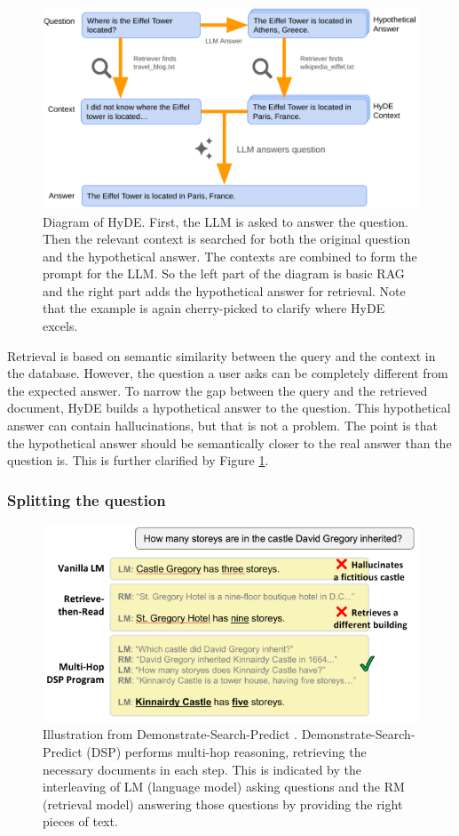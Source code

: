 \begin{figure}[h]
	\centering
	\includegraphics[width=0.9\linewidth]{fig/rag_hyde.png}
	\caption{Diagram of HyDE. First, the LLM is asked to answer the question. Then the relevant context is searched for both the original question and the hypothetical answer. The contexts are combined to form the prompt for the LLM. So the left part of the diagram is basic RAG and the right part adds the hypothetical answer for retrieval. Note that the example is again cherry-picked to clarify where HyDE excels.}
	\label{fig:rag_hyde}
\end{figure}

Retrieval is based on semantic similarity between the query and the context in the database. However, the question a user asks can be completely different from the expected answer. To narrow the gap between the query and the retrieved document, HyDE \cite{gao2023precisehyde} builds a hypothetical answer to the question. This hypothetical answer can contain hallucinations, but that is not a problem. The point is that the hypothetical answer should be semantically closer to the real answer than the question is. This is further clarified by Figure \ref{fig:rag_hyde}.

\subsubsection{Splitting the question}

\begin{figure}[h]
	\centering
	\includegraphics[width=0.7\linewidth]{fig/demonstrate_search_predict.png}
	\caption{Illustration from Demonstrate-Search-Predict \cite{khattab2022demonstrate}. Demonstrate-Search-Predict (DSP) performs multi-hop reasoning, retrieving the necessary documents in each step. This is indicated by the interleaving of LM (language model) asking questions and the RM (retrieval model) answering those questions by providing the right pieces of text.}
	\label{fig:demonstrate_search_predict}
\end{figure}


